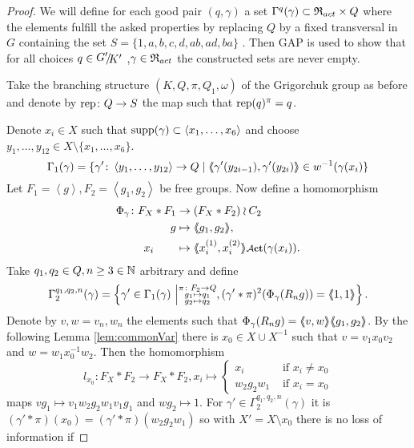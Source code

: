 \documentclass[a4paper,12pt]{article}
\begin{document}
\begin{proof}%
 We will define for each good pair $(q,\gamma)$ a set $\Gamma^q(\gamma)\subset \mathfrak{R}_{act}\times Q$ where the elements 
 fulfill the asked properties by replacing $Q$ by a fixed transversal in $G$ containing the set $S=\{1,a,b,c,d,ab,ad,ba\}$ .
 Then GAP is used to show that for all choices $q\in\RNK{G'}{K'}$,$\gamma\in\mathfrak{R}_{act}$ the constructed sets are never empty.
 \smallskip
 
 Take the branching structure $(K,Q,\pi,Q_1,\omega)$ of the Grigorchuk group as before and 
 denote by $\textup{rep}\colon Q\to S$ 
 the map such that $\textup{rep}(q)^\pi = q$.
 
 Denote $x_i\in X$ such that $\textup{supp}(\gamma) \subset \left<x_1,\ldots,x_6\right>$ and choose $y_1,\ldots,y_{12} \in X \setminus \{x_1,\ldots,x_6\}$.  
 \[\Gamma_1(\gamma) = \{\gamma' \colon \left< y_1,\ldots ,y_{12}\right> \to Q \mid \langle\negthickspace\langle\gamma'(y_{2i-1}),\gamma'(y_{2i})\rangle\negthickspace\rangle\in w^{-1}(\gamma(x_i)\}\] 
 Let $F_1=\left<g\right>,F_2=\left<g_1,g_2\right>$ be free groups. 
 Now define a homomorphism 
 \begin{align*}
  \Phi_{\gamma}\colon F_X*F_1 &\to (F_X*F_2)\wr C_2 \\ g&\mapsto \pair{g_1,g_2},\\ x_i\qquad &\mapsto \pair{x_i^{(1)},x_i^{(2)}}\act(\gamma(x_i)).
 \end{align*}
Take $q_1,q_2 \in Q,n\geq3\in \mathbb{N}$ arbitrary and define
 \[\Gamma_2^{q_1,q_2,n}(\gamma) = \left\{\gamma'\in \Gamma_1(\gamma) \ \middle \vert \substack{\pi\colon F_2\to Q\\
										g_1\mapsto q_1 \\
										g_2\mapsto q_2 }, (\gamma'*\pi)^2(\Phi_\gamma(R_ng))=\langle\negthickspace\langle1,1\rangle\negthickspace\rangle\right\}.\] 
 Denote by $v,w=v_n,w_n$ the elements such that $\Phi_\gamma(R_ng)=\langle\negthickspace\langle v,w\rangle\negthickspace\rangle\langle\negthickspace\langle g_1,g_2\rangle\negthickspace\rangle$. By the following Lemma \ref{lem:commonVar} there is 
 $x_0 \in X\cup X^{-1}$ such that $v=v_1x_0v_2$ and $w=w_1x_0^{-1}w_2$. Then the homomorphism
 \[l_{x_0}\colon F_X*F_2\to F_X*F_2, x_i \mapsto \begin{cases}
						x_i &\text{ if } x_i\neq {x_0} \\
						w_2g_2w_1 &\text{ if }x_i= {x_0} 
                                             \end{cases}\]
 maps $vg_1 \mapsto v_1w_2g_2w_1v_1g_1$ and $wg_2\mapsto 1$. 
 For $\gamma'\in \Gamma_2^{q_1,q_2,n}(\gamma)$ it is $(\gamma'*\pi)(x_0)=({\gamma'*\pi})(w_2g_2w_1)$ so with $X'=X\setminus x_0$ there is no loss of information if 

\end{proof}
\end{document}
